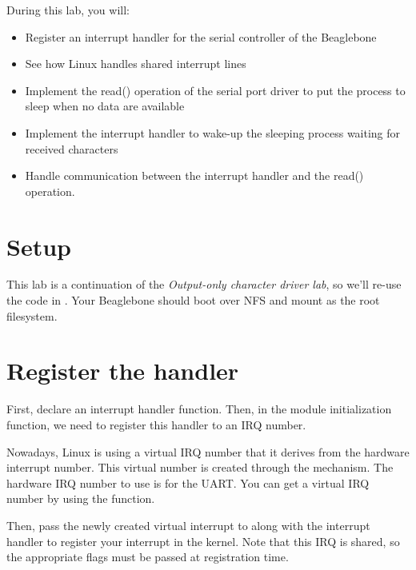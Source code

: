 
During this lab, you will:

\begin{itemize}
\item Register an interrupt handler for the serial controller of the
  Beaglebone
\item See how Linux handles shared interrupt lines
\item Implement the read() operation of the serial port driver to put
  the process to sleep when no data are available
\item Implement the interrupt handler to wake-up the sleeping process
  waiting for received characters
\item Handle communication between the interrupt handler and the
  read() operation.
\end{itemize}

\section{Setup}

This lab is a continuation of the {\em Output-only character driver
  lab}, so we'll re-use the code in
. Your Beaglebone should boot over
NFS and mount  as
the root filesystem.

\section{Register the handler}

First, declare an interrupt handler function. Then, in the module
initialization function, we need to register this handler to an IRQ
number.

Nowadays, Linux is using a virtual IRQ number that it derives from the
hardware interrupt number. This virtual number is created through the
 mechanism. The hardware IRQ number to use is
 for the UART. You can get a virtual IRQ number by using the
 function.

Then, pass the newly created virtual interrupt to 
along with the interrupt handler to register your interrupt in the
kernel. Note that this IRQ is shared, so the appropriate flags must be
passed at registration time.

